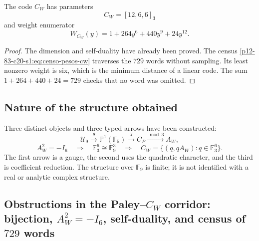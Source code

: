 \begin{theorem}
\label{p12-83-c20-s1:thm:enumerador-cw-autonomo}
The code \(C_W\) has parameters
\[
 \boxed{C_W=[12,6,6]_3}
\]
and weight enumerator
\begin{equation}
 \boxed{W_{C_W}(y)=1+264y^6+440y^9+24y^{12}.}
 \label{p12-83-c20-s1:eq:enumerador-pesos-cw}
\end{equation}
\end{theorem}

\begin{proof}
The dimension and self-duality have already been proved. The census
\eqref{p12-83-c20-s1:eq:censo-pesos-cw} traverses the \(729\) words without sampling. Its
least nonzero weight is six, which is the minimum distance of a linear code.
The sum \(1+264+440+24=729\) checks that no word was omitted.
\end{proof}

\subsection{Nature of the structure obtained}

Three distinct objects and three typed arrows have been constructed:
\[
 \mathcal U_9
 \xrightarrow{\theta}\mathbb P^1(\mathbb F_5)
 \xrightarrow{\chi}C_P
 \xrightarrow{\bmod3}A_W,
\]
\[
 A_W^2=-I_6
 \quad\Longrightarrow\quad
 \mathbb F_3^6\cong\mathbb F_9^3
 \quad\Longrightarrow\quad
 C_W=\{(q,qA_W):q\in\mathbb F_3^6\}.
\]
The first arrow is a gauge, the second uses the quadratic character, and the third is coefficient reduction. The structure over
\(\mathbb F_9\) is finite; it is not identified with a real or analytic complex structure.

\subsection{Obstructions in the Paley–\(C_W\) corridor: bijection, \(A_W^2=-I_6\), self-duality, and census of \(729\) words}

